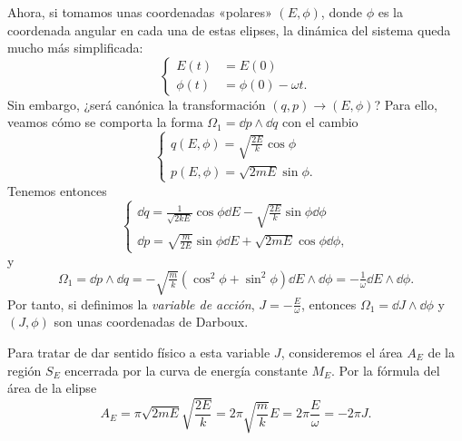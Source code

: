   Ahora, si tomamos unas coordenadas «polares» $(E,\phi)$, donde $\phi$ es la coordenada angular en cada una de estas elipses, la dinámica del sistema queda mucho más simplificada: 
  \begin{equation*}
    \begin{cases}
    E(t)&=E(0) \\
    \phi(t)&=\phi(0)-\omega t.
  \end{cases}
  \end{equation*}
  Sin embargo, ¿será canónica la transformación $(q,p) \rightarrow (E,\phi)$? Para ello, veamos cómo se comporta la forma $\Omega_1=\dd p\wedge \dd q$ con el cambio
  \begin{equation*}
    \begin{cases}
      q(E,\phi)=\sqrt{\frac{2E}{k}}\cos\phi\\
      p(E,\phi)=\sqrt{2mE}\sin \phi.
    \end{cases}
  \end{equation*}
  Tenemos entonces
  \begin{equation*}
    \begin{cases}
      \dd q= \frac{1}{\sqrt{2kE}}\cos \phi \dd E - \sqrt{\frac{2E}{k}} \sin \phi \dd \phi \\
      \dd p= \sqrt{\frac{m}{2E}}\sin \phi \dd E + \sqrt{2mE} \cos \phi \dd \phi,
    \end{cases}
  \end{equation*}
  y 
  \begin{equation*}
    \Omega_1= \dd p \wedge \dd q = -\sqrt{\tfrac{m}{k}}(\cos^2 \phi + \sin^2 \phi) \dd E \wedge \dd \phi= -\tfrac{1}{\omega} \dd E \wedge \dd \phi.
  \end{equation*}
  Por tanto, si definimos la \emph{variable de acción}, $J=-\frac{E}{\omega}$, entonces $\Omega_1=\dd J \wedge \dd \phi$ y $(J,\phi)$ son unas coordenadas de Darboux.

  Para tratar de dar sentido físico a esta variable $J$, consideremos el área $A_E$ de la región $S_E$ encerrada por la curva de energía constante $M_E$. Por la fórmula del área de la elipse
  \begin{equation*}
    A_E=\pi \sqrt{2mE} \sqrt{\frac{2E}{k}}=2\pi \sqrt{\frac{m}{k}} E= 2 \pi \frac{E}{\omega}= -2\pi J.
  \end{equation*}

